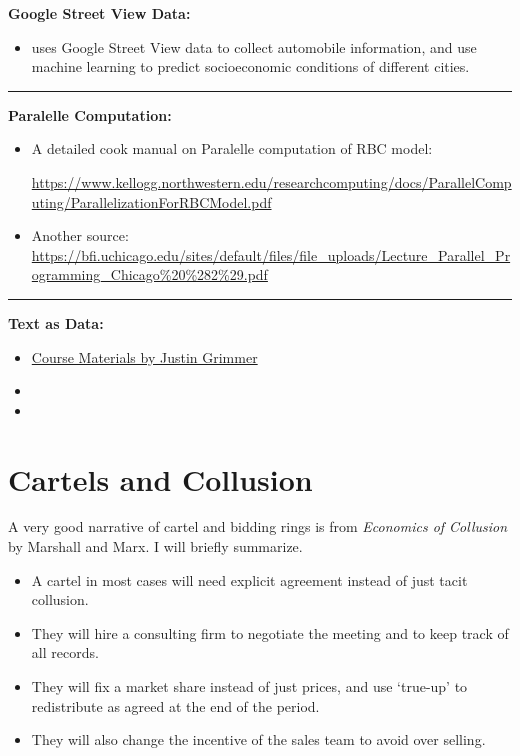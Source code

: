 \documentclass{book}
\theoremstyle{plain}
\theoremstyle{definition}
\newcommand{\myline}{\vspace{3mm} \hrule \vspace{4mm}}
\begin{document}
\noindent
\textbf{Google Street View Data:}
\begin{itemize}
	\item \cite{Gebru:2017wk} uses Google Street View data to collect automobile information, and use machine learning to predict socioeconomic conditions of different cities.
\end{itemize}

\myline

\noindent
\textbf{Paralelle Computation:}
\begin{itemize}
	\item A detailed cook manual on Paralelle computation of RBC model: 

	\url{https://www.kellogg.northwestern.edu/researchcomputing/docs/ParallelComputing/ParallelizationForRBCModel.pdf}

	\item Another source: \url{https://bfi.uchicago.edu/sites/default/files/file_uploads/Lecture_Parallel_Programming_Chicago%20%282%29.pdf}
\end{itemize}

\myline

\noindent
\textbf{Text as Data:}
\begin{itemize}
	\item \href{run:resources/text_as_data}{Course Materials by Justin Grimmer}
	\item {}
	\item {}
\end{itemize}


\chapter{Cartels and Collusion} %
\label{sec:cartels_and_collusion}

A very good narrative of cartel and bidding rings is from \textit{Economics of Collusion} by Marshall and Marx.
I will briefly summarize.


\begin{itemize}
	\item A cartel in most cases will need explicit agreement instead of just tacit collusion.
	\item They will hire a consulting firm to negotiate the meeting and to keep track of all records.
	\item They will fix a market share instead of just prices, and use `true-up' to redistribute as agreed at the end of the period.
	\item They will also change the incentive of the sales team to avoid over selling.
\end{itemize}
\end{document}
